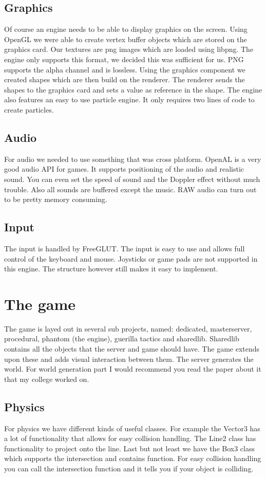 \documentclass[acmtoplas,acmnow]{acmtrans2m}
\begin{document}
\subsection{Graphics}
Of course an engine needs to be able to display graphics on the screen. Using OpenGL we were able to create vertex buffer objects which are stored on the graphics card. Our textures are png images which are loaded using libpng. The engine only supports this format, we decided this was sufficient for us. PNG supports the alpha channel and is lossless. Using the graphics component we created shapes which are then build on the renderer. The renderer sends the shapes to the graphics card and sets a value as reference in the shape. The engine also features an easy to use particle engine. It only requires two lines of code to create particles.

\subsection{Audio}
For audio we needed to use something that was cross platform. OpenAL is a very good audio API for games. It supports positioning of the audio and realistic sound. You can even set the speed of sound and the Doppler effect without much trouble. Also all sounds are buffered except the music. RAW audio can turn out to be pretty memory consuming.

\subsection{Input}
The input is handled by FreeGLUT. The input is easy to use and allows full control of the keyboard and mouse. Joysticks or game pads are not supported in this engine. The structure however still makes it easy to implement.

\section{The game}
The game is layed out in several sub projects, named: dedicated, masterserver, procedural, phantom (the engine), guerilla tactics and sharedlib. Sharedlib contains all the objects that the server and game should have. The game extends upon these and adds visual interaction between them. The server generates the world. For world generation part I would recommend you read the paper about it that my college worked on.

\subsection{Physics}
For physics we have different kinds of useful classes. For example the Vector3 has a lot of functionality that allows for easy collision handling. The Line2 class has functionality to project onto the line. Last but not least we have the Box3 class which supports the intersection and contains function. For easy collision handling you can call the intersection function and it tells you if your object is colliding.
\end{document}
